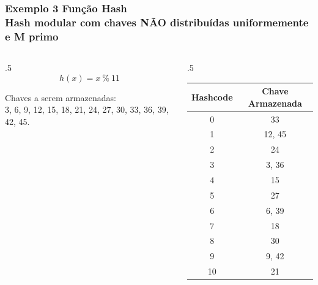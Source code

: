 \documentclass{beamer}
\begin{document}
\begin{frame}
  \frametitle{Exemplo 3 Função Hash\\\small{Hash modular com chaves NÃO distribuídas uniformemente e M primo}}

  \begin{columns}
    \begin{column}{.5\textwidth}
      \[ h(x) = x~\%~11 \]

      \center Chaves a serem armazenadas:\\3, 6, 9, 12, 15, 18, 21, 24, 27, 30, 33, 36, 39, 42, 45.
    \end{column}
    \begin{column}{.5\textwidth}

      \begin{table}[]
        \centering
        \small
        \begin{tabular}{@{}cc@{}}
          \toprule
          Hashcode & Chave Armazenada \\ \midrule
          0        & 33               \\
          1        & 12, 45           \\
          2        & 24               \\
          3        & 3, 36            \\
          4        & 15               \\
          5        & 27               \\
          6        & 6, 39            \\
          7        & 18               \\
          8        & 30               \\
          9        & 9, 42            \\
          10       & 21               \\ \bottomrule
        \end{tabular}
      \end{table}  
    \end{column}
  \end{columns}
\end{frame}
\end{document}
